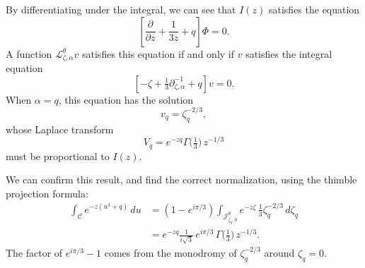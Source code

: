 \documentclass{article}
\newcommand{\laplace}{\mathcal{L}}
\theoremstyle{definition}
\theoremstyle{plain}
\begin{document}
\begin{itemize}
By differentiating under the integral, we can see that $I(z)$ satisfies the equation
\begin{equation}\label{eqn:degree-3-poly-1root}
\left[\frac{\partial}{\partial z} + \frac{1}{3z} +q \right] \Phi = 0.
\end{equation}
A function $\laplace_{\zeta,\alpha}^{\theta} v$ satisfies this equation if and only if $v$ satisfies the integral equation
\[ \left[ -\zeta + \tfrac{1}{3} \partial^{-1}_{\zeta, \alpha} +q  \right] v = 0. \]
When $\alpha = q$, this equation has the solution
\[ v_q = \zeta_q^{-2/3}, \]
whose Laplace transform
\[ V_q = e^{-zq} \Gamma\big(\tfrac{1}{3})\,z^{-1/3} \]
must be proportional to $I(z)$.

We can confirm this result, and find the correct normalization, using the thimble projection formula:
\begin{align*}
\int_{\mathcal{C}} e^{-z(u^3+q)}\,du & = (1 - e^{i\pi/3}) \int_{\mathcal{J}_{\zeta_q, 0}^\theta} e^{-z\zeta}\,\tfrac{1}{3}\zeta_q^{-2/3}\,d\zeta_q \\
& = e^{-zq}\tfrac{1}{i\sqrt{3}}\,e^{i\pi/3}\,\Gamma\big(\tfrac{1}{3})\,z^{-1/3}.
\end{align*}
The factor of $e^{i\pi/3} - 1$ comes from the monodromy of $\zeta_q^{-2/3}$ around $\zeta_q = 0$.
\end{itemize}
\end{document}
